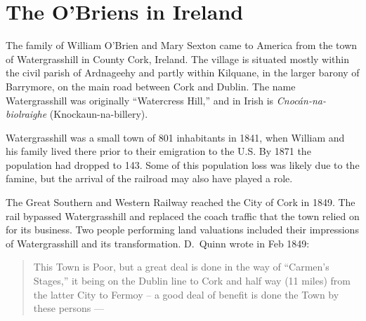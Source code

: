 \chapter{The O'Briens in Ireland}

The family of William O'Brien and Mary Sexton came to America from the town of Watergrasshill in County Cork, Ireland.\cite{Edward2OBrienNaturalization:1} The village is situated mostly within the civil parish of Ardnageehy and partly within Kilquane, in the larger barony of Barrymore, on the main road between Cork and Dublin.\cite{TopographicalDictionary} The name Watergrasshill was originally ``Watercress Hill,'' and in Irish is \textit{Cnoc\'{a}n-na-biolraighe} (Knockaun-na-billery).\cite{LocalNames}

Watergrasshill was a small town of 801 inhabitants in 1841, when William and his family lived there prior to their emigration to the U.S. By 1871 the population had dropped to 143.\cite{Population} Some of this population loss was likely due to the famine, but the arrival of the railroad may also have played a role. 

The Great Southern and Western Railway reached the City of Cork in 1849.\cite{Bianconi:1} The rail bypassed Watergrasshill and replaced the coach traffic that the town relied on for its business. Two people performing land valuations included their impressions of Watergrasshill and its transformation. D.\ Quinn wrote in Feb 1849:

\begin{quote}
	This Town is Poor, but a great deal is done in the way of ``Carmen's Stages,'' it being on the Dublin line to Cork and half way (11 miles) from the latter City to Fermoy -- a good deal of benefit is done the Town by these persons ---\cite{HouseIntro:1}
\end{quote}

